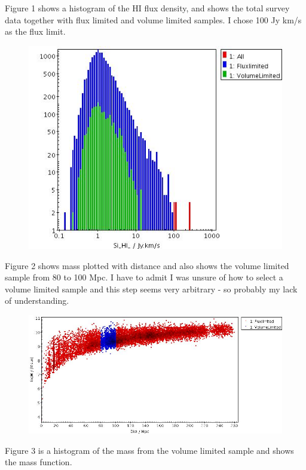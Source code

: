 \documentclass[a4paper,12pt]{article}
\begin{document}
Figure 1 shows a histogram of the HI flux density, and shows the total survey data together with flux limited and volume limited samples. I chose 100 Jy  km/s
as the flux limit.
\begin{figure}[H]
\centering
\includegraphics[width=.9\textwidth]{./SiH1.jpg}
\caption{}
\label{fig:1}
\end{figure}
Figure 2 shows mass plotted with distance and also shows the volume limited sample from 80 to 100 Mpc. I have to admit I was unsure of how to select a
volume limited sample and this step seems very arbitrary - so probably my lack of understanding.
\begin{figure}[H]
\centering
\includegraphics[width=.9\textwidth]{./MassDistance.jpg}
\caption{}
\label{fig:2}
\end{figure}
Figure 3 is a histogram of the mass from the volume limited sample and shows the mass function.
\end{document}
